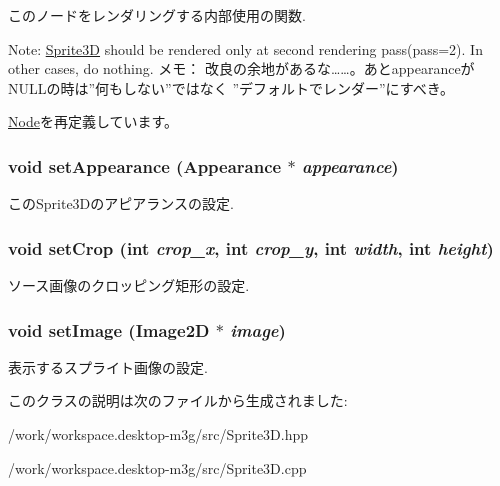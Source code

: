 このノードをレンダリングする内部使用の関数.

Note: \hyperlink{classm3g_1_1Sprite3D}{Sprite3D} should be rendered only at second rendering pass(pass=2). In other cases, do nothing. メモ： 改良の余地があるな……。あとappearanceがNULLの時は”何もしない”ではなく ”デフォルトでレンダー”にすべき。 

\hyperlink{classm3g_1_1Node_8babc8a79b78615da51161e94029eea9}{Node}を再定義しています。\hypertarget{classm3g_1_1Sprite3D_b9b44bad4241635062ed66437c9bae48}{
\subsubsection[{setAppearance}]{\setlength{\rightskip}{0pt plus 5cm}void setAppearance ({\bf Appearance} $\ast$ {\em appearance})}}
\label{classm3g_1_1Sprite3D_b9b44bad4241635062ed66437c9bae48}


このSprite3Dのアピアランスの設定. \hypertarget{classm3g_1_1Sprite3D_35ca6d3ff64f2232a0f3a11bf4ab483e}{
\subsubsection[{setCrop}]{\setlength{\rightskip}{0pt plus 5cm}void setCrop (int {\em crop\_\-x}, \/  int {\em crop\_\-y}, \/  int {\em width}, \/  int {\em height})}}
\label{classm3g_1_1Sprite3D_35ca6d3ff64f2232a0f3a11bf4ab483e}


ソース画像のクロッピング矩形の設定. \hypertarget{classm3g_1_1Sprite3D_705b89b41cd1b38f664ed912be44baaa}{
\subsubsection[{setImage}]{\setlength{\rightskip}{0pt plus 5cm}void setImage ({\bf Image2D} $\ast$ {\em image})}}
\label{classm3g_1_1Sprite3D_705b89b41cd1b38f664ed912be44baaa}


表示するスプライト画像の設定. 

このクラスの説明は次のファイルから生成されました:\begin{CompactItemize}
\item 
/work/workspace.desktop-m3g/src/Sprite3D.hpp\item 
/work/workspace.desktop-m3g/src/Sprite3D.cpp\end{CompactItemize}

